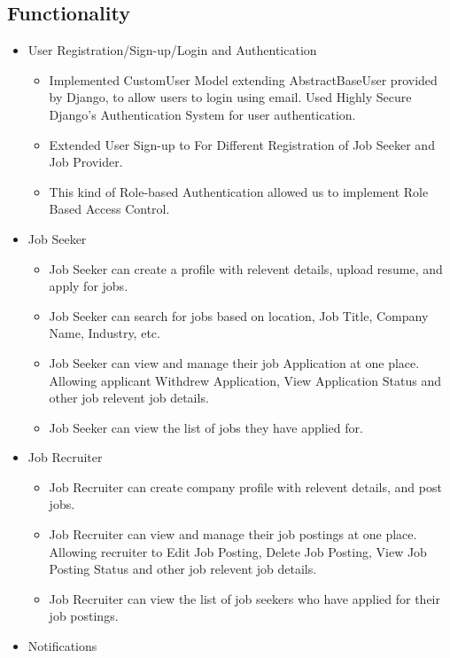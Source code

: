 \documentclass[12pt]{article}
\begin{document}
\begin{itemize}
\section*{Functionality}
\begin{itemize}
    \item User Registration/Sign-up/Login and Authentication
    \begin{itemize}
        \item Implemented CustomUser Model extending AbstractBaseUser provided by Django, to allow users to login using email. Used Highly Secure Django's Authentication System for user authentication.
        \item Extended User Sign-up to For Different Registration of Job Seeker and Job Provider.
        \item This kind of Role-based Authentication allowed us to implement Role Based Access Control.
    \end{itemize}
    \item Job Seeker
    \begin{itemize}
        \item Job Seeker can create a profile with relevent details, upload resume, and apply for jobs.
        \item Job Seeker can search for jobs based on location, Job Title, Company Name, Industry, etc.
        \item Job Seeker can view and manage their job Application at one place. Allowing applicant Withdrew Application, View Application Status and other job relevent job details.
        \item Job Seeker can view the list of jobs they have applied for.
    \end{itemize}
    \item Job Recruiter
    \begin{itemize}
        \item Job Recruiter can create company profile with relevent details, and post jobs.
        \item Job Recruiter can view and manage their job postings at one place. Allowing recruiter to Edit Job Posting, Delete Job Posting, View Job Posting Status and other job relevent job details.
        \item Job Recruiter can view the list of job seekers who have applied for their job postings.
    \end{itemize}
    \item Notifications
    \begin{itemize}

\end{itemize}
\end{itemize}
\end{itemize}
\end{document}
